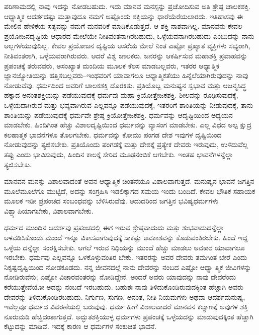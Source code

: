 ಪರಿಣಾಮದಲ್ಲಿ ನಾವು ಇದನ್ನು ನೋಡಬಹುದು. ಇದು ಮಾನವ ಮನಸ್ಸನ್ನು ಪ್ರಚೋದಿಸುವ ಅತಿ ಶ್ರೇಷ್ಠ ಚಾಲಕಶಕ್ತಿ. ಆಧ್ಯಾತ್ಮಿಕ ಆದರ್ಶದಷ್ಟು ಮತ್ತಾವುದೂ ನಮಗೆ ಅಷ್ಟೊಂದು ಶಕ್ತಿಯನ್ನು ಧಾರೆಯೆರೆಯಲಾರದು. ಇತಿಹಾಸವು ಈ ಮೇಲಿನ ಹೇಳಿಕೆಯ ಸತ್ಯವನ್ನು ನಮಗೆ ಮನವರಿಕೆ ಮಾಡಿಕೊಡುತ್ತದೆ. ಆ ಶಕ್ತಿ ನಾಶವಾಗಿಲ್ಲ. ಮಾನವನು ಕೇವಲ ಪ್ರಯೋಜನದೃಷ್ಟಿಯ ಆಧಾರದ ಮೇಲೆಯೇ ನೀತಿವಂತನಾಗಿರಬಹುದು, ಒಳ್ಳೆಯವನಾಗಿರಬಹುದು ಎಂಬುದನ್ನು ನಾನು ಅಲ್ಲಗಳೆಯುವುದಿಲ್ಲ. ಕೇವಲ ಪ್ರಯೋಜನ ದೃಷ್ಟಿಯ ಆಸರೆಯ ಮೇಲೆ ನಿಂತ ಎಷ್ಟೋ ಪ್ರಖ್ಯಾತ ವ್ಯಕ್ತಿಗಳು ಸಭ್ಯರಾಗಿ, ನೀತಿವಂತರಾಗಿ, ಒಳ್ಳೆಯವರಾಗಿರುವರು. ಆದರೆ ವಿಶ್ವ ಚಾಲಕರು. ಜನರನ್ನು ಆಕರ್ಷಿಸುವ ಮಹಾಶಕ್ತಿ ಪ್ರವಾಹವನ್ನು ಪ್ರಪಂಚಕ್ಕೆ ತರುವವರು, ಅಸಂಖ್ಯಾತ ಮಂದಿಯ ಮೂಲಕ ಕೆಲಸ ಮಾಡಬಲ್ಲವರು, ಇತರರ ಆಧ್ಯಾತ್ಮಿಕ ಜ್ಞಾನಜ್ಯೋತಿಯನ್ನು ಹತ್ತಿಸಬಲ್ಲವರು–ಇಂಥವರಿಗೆ ಯಾವಾಗಲೂ ಆಧ್ಯಾತ್ಮಿಕತೆಯು ಹಿನ್ನೆಲೆಯಾಗಿರುವುದನ್ನು ನಾವು ನೋಡುವೆವು. ಧರ್ಮದಿಂದ ಅವರಿಗೆ ಚಾಲಕಶಕ್ತಿ ದೊರಕಿತು. ಪ್ರತಿಯೊಬ್ಬ ಮನುಷ್ಯನ ಸ್ವಭಾವ ಮತ್ತು ಆಜನ್ಮಸಿದ್ಧ ಹಕ್ಕಾದ ಅನಂತಶಕ್ತಿಯನ್ನು ಪಡೆಯುವುದಕ್ಕೆ ಧರ್ಮವು ಮಹಾ ಕ್ರಿಯೋತ್ತೇಜಕಶಕ್ತಿ. ಶೀಲವನ್ನು ರೂಢಿಸುವುದಕ್ಕೆ, ಒಳ್ಳೆಯದಾಗಿರುವ ಮತ್ತು ಭವ್ಯವಾಗಿರುವ ಎಲ್ಲವನ್ನೂ ಪಡೆಯುವುದಕ್ಕೆ, ಇತರರಿಗೆ ಶಾಂತಿಯನ್ನು ನೀಡುವುದಕ್ಕೆ, ತಾನು ಶಾಂತಿಯನ್ನು ಪಡೆಯುವುದಕ್ಕೆ ಧರ್ಮವೇ ಶ್ರೇಷ್ಠ ಕ್ರಿಯೋತ್ತೇಜಕಶಕ್ತಿ. ಧರ್ಮವನ್ನು ಆದೃಷ್ಟಿಯಿಂದ ಅಧ್ಯಯನ ಮಾಡಬೇಕು. ಹಿಂದಿಗಿಂತ ಹೆಚ್ಚು ವಿಶಾಲದೃಷ್ಟಿಯಿಂದ ಧರ್ಮವನ್ನು ವ್ಯಾಸಂಗ ಮಾಡಬೇಕು. ಎಲ್ಲ ವಿಧದ ಅಲ್ಪ ಕ್ಷುದ್ರ ಕಲಹಾತ್ಮಕ ಭಾವನೆಗಳೂ ತೊಲಗಬೇಕು. ಧರ್ಮವನ್ನು ಕೋಮು ಪಂಗಡ ದೇಶ ಇವುಗಳ ದೃಷ್ಟಿಯಿಂದ ನೋಡುವುದನ್ನು ತ್ಯಜಿಸಬೇಕು. ಪ್ರತಿಯೊಂದು ಪಂಗಡಕ್ಕೆ ಮತ್ತು ದೇಶಕ್ಕೆ ಪ್ರತ್ಯೇಕ ದೇವರು ಇರುವುದು, ಉಳಿದುವೆಲ್ಲ ತಪ್ಪು ಎಂದು ಭಾವಿಸುವುದು, ಹಿಂದಿನ ಕಾಲಕ್ಕೆ ಸೇರಿದ ಮೂಢನಂಬಿಕೆ ಆಗಬೇಕು. ಇಂತಹ ಭಾವನೆಗಳನ್ನೆಲ್ಲಾ ತ್ಯಜಿಸಬೇಕು.

ಮಾನವನ ಮನಸ್ಸು ವಿಶಾಲವಾದಂತೆ ಅವನ ಆಧ್ಯಾತ್ಮಿಕ ಚಿಂತನೆಯೂ ವಿಶಾಲವಾಗುತ್ತದೆ. ಮನುಷ್ಯನ ಭಾವನೆ ಜಗತ್ತಿನ ಮೂಲೆಮೂಲೆಗೂ ಮುಟ್ಟಿದೆ, ಅದನ್ನು ಸಂಗ್ರಹಿಸಿ ಇಡಲಿಕ್ಕಾಗದ ಸಮಯ ಇಂದು ಬಂದಿದೆ. ಕೇವಲ ಭೌತಿಕ ಸಹಾಯಕ ಮೂಲಕ ಇಡೀ ಪ್ರಪಂಚದ ಸಂಬಂಧವನ್ನು ಬೆಳಿಸಿರುವೆವು. ಆದುದರಿಂದ ಜಗತ್ತಿನ ಭವಿಷ್ಯಧರ್ಮಗಳು ವಿಶ್ವ್ಯಾಪಿಯಾಗಬೇಕು, ವಿಶಾಲವಾಗಬೇಕು.

ಧರ್ಮದ ಮುಂದಿನ ಆದರ್ಶವು ಪ್ರಪಂಚದಲ್ಲಿ ಈಗ ಇರುವ ಶ್ರೇಷ್ಠವಾದುದು ಮತ್ತು ಶುಭವಾದುದನ್ನೆಲ್ಲಾ ಅಳವಡಿಸಿಕೊಂಡು ಮುಂದೆ ಇನ್ನೂ ವಿಕಾಸವಾಗುವುದಕ್ಕೆ ಸಾಕಷ್ಟು ಅವಕಾಶವನ್ನು ಕೊಡುವಂತಿರಬೇಕು. ಹಿಂದೆ ಇದ್ದ ಒಳ್ಳೆಯ ದನ್ನೆಲ್ಲಾ ಸಂರಕ್ಷಿಸಬೇಕು. ಆಗಲೆ ಇರುವ ನಿಧಿಯನ್ನು ಮುಂದೆ ಹೆಚ್ಚು ಮಾಡಲು ಅವಕಾಶ ಯಾವಾಗಲೂ ಇರಬೇಕು. ಧರ್ಮವು ಎಲ್ಲವನ್ನೂ ಒಳಕೊಳ್ಳುವಂತಿರ ಬೇಕು. ಇತರರನ್ನು ಅವರ ದೇವರು ತಮಗಿಂತ ಬೇರೆ ಎಂದು ನಿಕೃಷ್ಟದೃಷ್ಟಿಯಿಂದ ನೋಡಕೂಡದು. ನನ್ನ ಜೀವನದಲ್ಲೆ ನಾನು ದೇವರನ್ನು ನಂಬದ ಎಷ್ಟೋ ಆಧ್ಯಾ ತ್ಮಿಕ ಜೀವಿಗಳನ್ನು ನೋಡಿರುವೆನು; ಎಷ್ಟೋ ವಿಚಾರವಂತರನ್ನು ನೋಡಿದ್ದೇನೆ. ಅಂದರೆ ಅವರು ಯಾವುದನ್ನು ನಾವು ದೇವರೆಂದು ಕರೆಯುತ್ತೇವೆಯೋ ಅದನ್ನು ನಂಬದೆ ಇರಬಹುದು. ಬಹುಶಃ ನಾವು ತಿಳಿದುಕೊಂಡಿರುವುದಕ್ಕಿಂತ ಹೆಚ್ಚಾಗಿ ಅವರು ದೇವರನ್ನು ತಿಳಿದುಕೊಂಡಿರಬಹುದು. ನಿರ್ಗುಣ, ಸುಗಣ, ಅನಂತ, ನೀತಿ ನಿಯಮಗಳು ಅಥವಾ ಆದರ್ಶಮನುಷ್ಯ, ಇವೆಲ್ಲವೂ ಧರ್ಮದ ವಿವರಣೆಯಲ್ಲಿ ಬರುವುವು. ಧರ್ಮ ಹೀಗೆ ವಿಶಾಲವಾದರೆ ಮಾನವನ ಕಲ್ಯಾಣಕ್ಕೆ ಅವುಗಳ ಶಕ್ತಿ ನೂರುಮಡಿ ಹೆಚ್ಚಿದಂತಾಗುತ್ತದೆ. ಅದ್ಭುತಶಕ್ತಿಯುಳ್ಳ ಧರ್ಮಗಳು ಪ್ರಪಂಚಕ್ಕೆ ಒಳ್ಳೆಯದನ್ನು ಮಾಡುವುದಕ್ಕಿಂತ ಹೆಚ್ಚಾಗಿ ಕೆಟ್ಟುದನ್ನು ಮಾಡಿವೆ. ಇದಕ್ಕೆ ಕಾರಣ ಆ ಧರ್ಮಗಳ ಸಂಕುಚಿತ ಭಾವನೆ.

